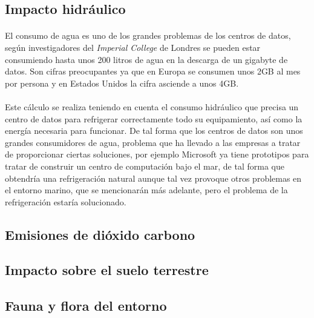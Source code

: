 \documentclass[10pt]{article}
\begin{document}
	  \subsection{Impacto hidráulico}
	  	\paragraph{}
		El consumo de agua es uno de los grandes problemas de los centros de datos, según investigadores del \textit{Imperial College} de Londres se pueden estar consumiendo hasta unos 200 litros de agua en la descarga de un gigabyte de datos. Son cifras preocupantes ya que en Europa se consumen unos 2GB al mes por persona y en Estados Unidos la cifra asciende a unos 4GB. 
        
        \paragraph{}
        Este cálculo se realiza teniendo en cuenta el consumo hidráulico que precisa un centro de datos para refrigerar correctamente todo su equipamiento, así como la energía necesaria para funcionar. De tal forma que los centros de datos son unos grandes consumidores de agua, problema que ha llevado a las empresas a tratar de proporcionar ciertas soluciones, por ejemplo Microsoft ya tiene prototipos para tratar de construir un centro de computación bajo el mar, de tal forma que obtendría una refrigeración natural aunque tal vez provoque otros problemas en el entorno marino, que se mencionarán más adelante, pero el problema de la refrigeración estaría solucionado.
        
	  \subsection{Emisiones de dióxido carbono}
	  	\paragraph{}
		
        
	  \subsection{Impacto sobre el suelo terrestre}
	  	\paragraph{}

	  \subsection{Fauna y flora del entorno}
\end{document}
